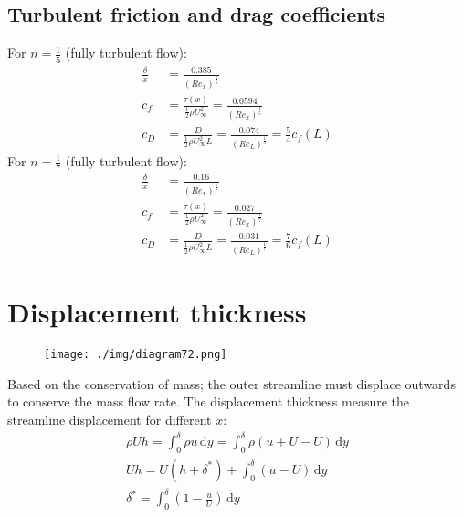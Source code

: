 \subsection{Turbulent friction and drag coefficients}
For $n = \frac{1}{5}$ (fully turbulent flow):
\begin{align}
  \frac{\delta}{x} & = \frac{0.385}{(Re_x)^{\frac{1}{5}}}                                                                 \\
  c_f              & = \frac{\tau (x)}{\frac{1}{2}\rho U_\infty^2} = \frac{0.0594}{(Re_x)^\frac{1}{5}}                    \\
  c_D              & = \frac{D}{\frac{1}{2} \rho U_\infty^2 L} = \frac{0.074}{(Re_L)^{\frac{1}{5}}} = \frac{5}{4} c_f (L)
\end{align}
For $n = \frac{1}{7}$ (fully turbulent flow):
\begin{align}
  \frac{\delta}{x} & = \frac{0.16}{(Re_x)^{\frac{1}{7}}}                                                                 \\
  c_f              & = \frac{\tau (x)}{\frac{1}{2} \rho U_\infty^2} = \frac{0.027}{(Re_x)^{\frac{1}{7}}}                 \\
  c_D              & = \frac{D}{\frac{1}{2}\rho U_\infty^2 L} = \frac{0.031}{(Re_L)^{\frac{1}{7}}} = \frac{7}{6} c_f (L)
\end{align}
\section{Displacement thickness}
\begin{figure}[H]
  \centering
  \texttt{[image: ./img/diagram72.png]}
  \caption{}
\end{figure}
Based on the conservation of mass; the outer streamline must displace outwards to conserve the mass flow rate. The displacement thickness measure the streamline displacement for different $x$:
\begin{gather}
  \rho U h = \int_{0}^{\delta} \rho u \,\mathrm{d}y = \int_{0}^{\delta} \rho \left(u + U - U\right) \,\mathrm{d}y\\
  Uh = U(h + \delta^*) + \int_{0}^{\delta} \left(u - U\right) \,\mathrm{d}y\\
  \delta^* = \int_{0}^{\delta} \left(1 - \frac{u}{U}\right) \,\mathrm{d}y
\end{gather}
